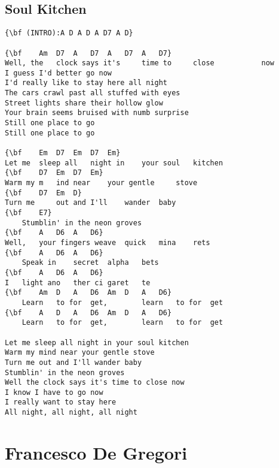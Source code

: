 \documentclass[a4paper]{article}
\begin{document}
\subsection{Soul Kitchen} %
\label{sub:Soul Kitche}
\begin{Verbatim}
{\bf (INTRO):A D A D A D7 A D}

{\bf  	Am	D7	A	D7	A	D7	A	D7}
Well, the 	clock says it's 	time to 	close 	    	now	 	 	 
I guess I'd better go now
I'd really like to stay here all night
The cars crawl past all stuffed with eyes
Street lights share their hollow glow
Your brain seems bruised with numb surprise
Still one place to go
Still one place to go

{\bf  	Em	D7	Em	D7	Em}
Let me 	sleep all 	night in 	your soul 	kitchen	 
{\bf  	D7	Em	D7	Em}
Warm my m	ind near 	your gentle 	stove	 
{\bf  	D7	Em	D}
Turn me 	out and I'll 	wander 	baby
{\bf  	E7}
 	Stumblin' in the neon groves
{\bf  	A	D6	A	D6}
Well, 	your fingers weave 	quick 	mina	rets
{\bf  	A	D6	A	D6}
 	Speak in 	secret 	alpha	bets
{\bf  	A	D6	A	D6}
I 	light ano	ther ci	garet	te
{\bf  	Am	D	A	D6	Am	D	A	D6}
 	Learn 	to for	get,	   	learn 	to for	get	 
{\bf  	A	D	A	D6	Am	D	A	D6}
 	Learn 	to for	get,	   	learn 	to for	get	 

Let me sleep all night in your soul kitchen
Warm my mind near your gentle stove
Turn me out and I'll wander baby
Stumblin' in the neon groves
Well the clock says it's time to close now
I know I have to go now
I really want to stay here
All night, all night, all night
\end{Verbatim}
\newpage
\section{Francesco De Gregori} %
\label{sec:Francesco De Gregori}
\end{document}
